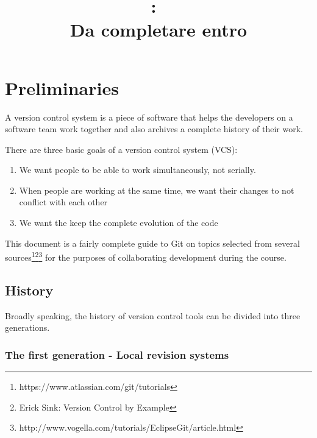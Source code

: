 \documentclass{article}
\title{
\vspace{2in}
\textmd{\textbf{\hmwkClass:\ \hmwkTitle}}\\
\normalsize\vspace{0.1in}\small{Da completare entro \hmwkDueDate}\\
\vspace{0.1in}\large{\textit{\hmwkClassInstructor}}
\vspace{3in}
}
\author{\textbf{\hmwkAuthorName}}
\date{} %
\begin{document}
\maketitle



\newpage
\tableofcontents
\newpage




 \section{Preliminaries}

A version control system is a piece of software that helps the
developers on a software team work together and also archives a
complete history of their work.

There are three basic goals of a version control system (VCS):

\begin{enumerate}
\item We want people to be able to work simultaneously, not serially.
\item When people are working at the same time, we want their changes
  to not conflict with each other
\item We want the keep the complete evolution of the code
\end{enumerate}

This document is a fairly complete guide to Git on topics selected
from several
sources\footnote{https://www.atlassian.com/git/tutorials}\footnote{Erick
  Sink: Version Control by
  Example}\footnote{http://www.vogella.com/tutorials/EclipseGit/article.html}
for the purposes of collaborating development during the course.

\subsection*{History}
Broadly speaking, the history of version control tools can be divided
into three generations.

\subsubsection*{The first generation - Local revision systems}
\end{document}
